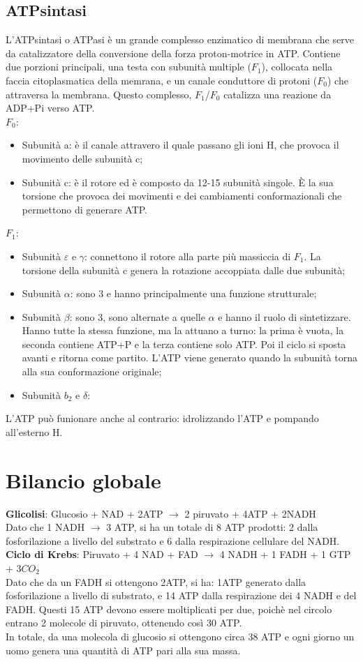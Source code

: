 \subsection{ATPsintasi}
L'ATPsintasi o ATPasi \`e un grande complesso enzimatico di membrana che serve da catalizzatore della conversione della forza proton-motrice in ATP. Contiene due porzioni principali, una testa con subunit\`a multiple ($F_1$), collocata nella faccia citoplasmatica della memrana, e un canale conduttore di protoni ($F_0$) che attraversa la membrana. Questo complesso, $F_1$/$F_0$ catalizza una reazione da ADP+Pi verso ATP.
\\$F_0$:
\begin{itemize}
    \item Subunit\`a a: \`e il canale attravero il quale passano gli ioni H\ap{+}, che provoca il movimento delle subunit\`a c;
    \item Subunit\`a c: \`e il rotore ed \`e composto da 12-15 subunit\`a singole. \`E la sua torsione che provoca dei movimenti e dei cambiamenti conformazionali che permettono di generare ATP.
\end{itemize}
$F_1$:
\begin{itemize}
    \item Subunit\`a $\varepsilon$ e $\gamma$: connettono il rotore alla parte pi\`u massiccia di $F_1$. La torsione della subunit\`a c genera la rotazione accoppiata dalle due subunit\`a;
    \item Subunit\`a $\alpha$: sono 3 e hanno principalmente una funzione strutturale;
    \item Subunit\`a $\beta$: sono 3, sono alternate a quelle $\alpha$ e hanno il ruolo di sintetizzare. Hanno tutte la stessa funzione, ma la attuano a turno: la prima \`e vuota, la seconda contiene ATP+P e la terza contiene solo ATP. Poi il ciclo si sposta avanti e ritorna come partito. L'ATP viene generato quando la subunit\`a torna alla sua conformazione originale;
    \item Subunit\`a $b_2$ e $\delta$: 
\end{itemize}
L'ATP pu\`o funionare anche al contrario: idrolizzando l'ATP e pompando all'esterno H\ap{+}.
\section{Bilancio globale}
\textbf{Glicolisi}: Glucosio + NAD\ap{+} + 2ATP $\xrightarrow{}$ 2 piruvato + 4ATP + 2NADH
\\Dato che 1 NADH $\xrightarrow{}$ 3 ATP, si ha un totale di 8 ATP prodotti: 2 dalla fosforilazione a livello del substrato e 6 dalla respirazione cellulare del NADH.
\\\textbf{Ciclo di Krebs}: Piruvato + 4 NAD\ap{+} + FAD $\xrightarrow{}$ 4 NADH + 1 FADH + 1 GTP + $3CO_2$
\\Dato che da un FADH si ottengono 2ATP, si ha: 1ATP generato dalla fosforilazione a livello di substrato, e 14 ATP dalla respirazione dei 4 NADH e del FADH. Questi 15 ATP devono essere moltiplicati per due, poich\`e nel circolo entrano 2 molecole di piruvato, ottenendo cos\`i 30 ATP.
\\In totale, da una molecola di glucosio si ottengono circa 38 ATP e ogni giorno un uomo genera una quantit\`a di ATP pari alla sua massa.
